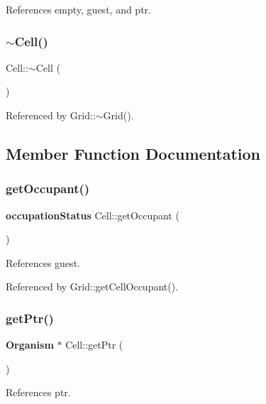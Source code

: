 References empty, guest, and ptr.

\mbox{\label{classCell_a9fa559f7a28e2b4336c6879ca09304d8}} 
\subsubsection{$\sim$\+Cell()}
{\footnotesize\ttfamily Cell\+::$\sim$\+Cell (\begin{DoxyParamCaption}{ }\end{DoxyParamCaption})\hspace{0.3cm}{\ttfamily [virtual]}}



Referenced by Grid\+::$\sim$\+Grid().



\subsection{Member Function Documentation}
\mbox{\label{classCell_a7dcb8bc75a2e2591b3fd52b5f7c28ab1}} 
\subsubsection{get\+Occupant()}
{\footnotesize\ttfamily \textbf{ occupation\+Status} Cell\+::get\+Occupant (\begin{DoxyParamCaption}{ }\end{DoxyParamCaption})}



References guest.



Referenced by Grid\+::get\+Cell\+Occupant().

\mbox{\label{classCell_a1009c9d271700e6ee9a7da1eca77802a}} 
\subsubsection{get\+Ptr()}
{\footnotesize\ttfamily \textbf{ Organism} $\ast$ Cell\+::get\+Ptr (\begin{DoxyParamCaption}{ }\end{DoxyParamCaption})}



References ptr.



